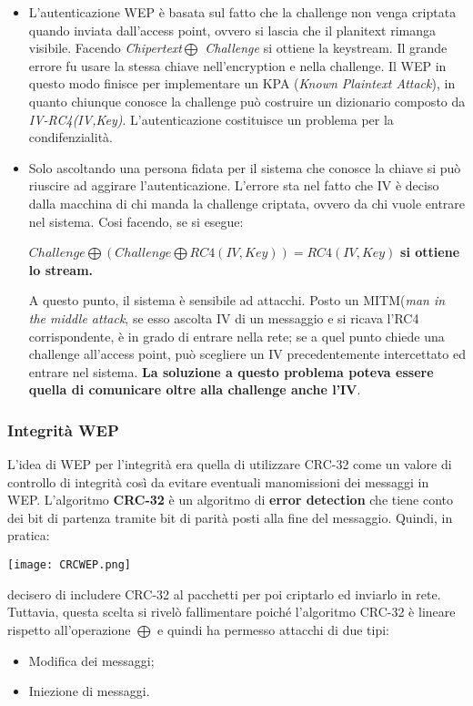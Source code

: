 \documentclass{article}
\theoremstyle{remark}
\begin{document}
\begin{itemize}
	\item L'autenticazione WEP è basata sul fatto che la challenge non venga criptata quando inviata dall'access point, ovvero si lascia che il planitext rimanga visibile. Facendo \emph{Chipertext$\bigoplus$ Challenge} si ottiene la keystream. Il grande errore fu usare la stessa chiave nell'encryption e nella challenge. Il WEP in questo modo finisce per implementare un KPA (\emph{Known Plaintext Attack}), in quanto chiunque conosce la challenge può costruire un dizionario composto da \emph{IV-RC4(IV,Key)}. L'autenticazione costituisce un problema per la condifenzialità.
	\item Solo ascoltando una persona fidata per il sistema che conosce la chiave si può riuscire ad aggirare l'autenticazione. L'errore sta nel fatto che IV è deciso dalla macchina di chi manda la challenge criptata, ovvero da chi vuole entrare nel sistema. Cosi facendo, se si esegue:\begin{center}
		      $Challenge\bigoplus (Challenge \bigoplus RC4(IV,Key))=RC4(IV,Key)$ \textbf{si ottiene lo stream.}
	      \end{center}
	      A questo punto, il sistema è sensibile ad attacchi. Posto un MITM(\emph{man in the middle attack}, se esso ascolta IV di un messaggio e si ricava l'RC4 corrispondente, è in grado di entrare nella rete; se a quel punto chiede una challenge all'access point, può scegliere un IV precedentemente intercettato ed entrare nel sistema.\newline
	      \textbf{La soluzione a questo problema poteva essere quella di comunicare oltre alla challenge anche l'IV}.
\end{itemize}
\subsubsection{Integrità WEP}
L'idea di WEP per l'integrità era quella di utilizzare CRC-32 come un valore di controllo di integrità così da evitare eventuali manomissioni dei messaggi in WEP.
L'algoritmo \textbf{CRC-32} è un algoritmo di \textbf{error detection} che tiene conto dei bit di partenza tramite bit di parità posti alla fine del messaggio. Quindi, in pratica:
\begin{center}
	\texttt{[image: CRCWEP.png]}
\end{center}
decisero di includere CRC-32 al pacchetti per poi criptarlo ed inviarlo in rete. Tuttavia, questa scelta si rivelò fallimentare poiché l'algoritmo CRC-32 è lineare rispetto all'operazione $\bigoplus$ e quindi ha permesso attacchi di due tipi:
\begin{itemize}
	\item Modifica dei messaggi;
	\item Iniezione di messaggi.
\end{itemize}
\end{document}
